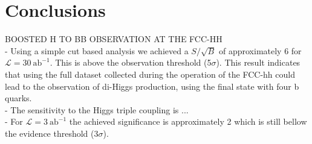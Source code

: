 
\chapter{Conclusions}
\label{chapter:conclusions}

BOOSTED H TO BB OBSERVATION AT THE FCC-HH \\
- Using a simple cut based analysis we achieved a $S/\sqrt{B}$ of approximately 6 for $\mathcal{L}=30~\text{ab}^{-1}$. This is above the observation threshold (5$\sigma$). This result indicates that using the full dataset collected during the operation of the FCC-hh could lead to the observation of di-Higgs production, using the final state with four b quarks.\\
- The sensitivity to the Higgs triple coupling is ... \\
- For $\mathcal{L}=3~\text{ab}^{-1}$ the achieved significance is approximately 2 which is still bellow the evidence threshold (3$\sigma$). 
\newline

